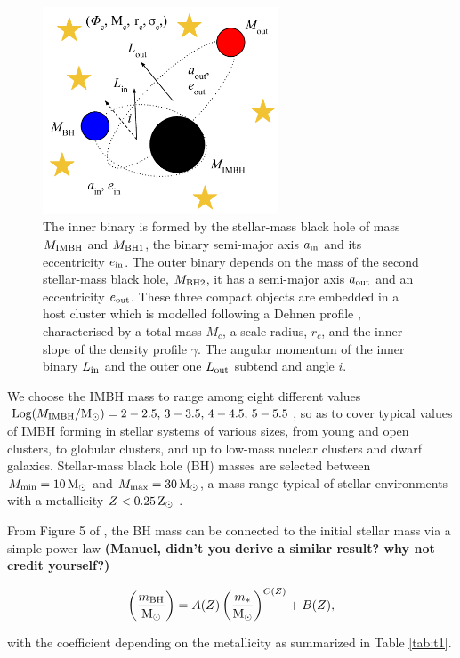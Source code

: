 \documentclass[useAMS,usenatbib]{mn2e}
\newcommand{\Ms}{{\rm M}_\odot}
\newcommand{\Zs}{{\rm Z}_\odot}
\newcommand{\ibh}{{\rm IMBH}}
\newcommand{\inn}{{\rm in}}
\newcommand{\out}{{\rm out}}
\newcommand{\bh}{{\rm BH}}
\newcommand{\bhu}{{\rm BH1}}
\newcommand{\bhd}{{\rm BH2}}
\begin{document}
\begin{figure}
    \centering
    \includegraphics[width=7cm]{triple}
    \caption{The inner binary is formed by the stellar-mass black hole of mass  $M_\ibh$ and $M_\bhu$, 
the binary semi-major axis $a_\inn$ and its eccentricity $e_\inn$. The outer binary depends on the mass of the
second stellar-mass black hole, $M_\bhd$, it has a semi-major axis  $a_\out$ and an eccentricity $e_\out$.
These three compact objects are embedded in a host cluster which is modelled following a Dehnen profile \citep{Deh93},
characterised by a total mass $M_c$, a scale radius, $r_c$, and the inner slope of the density profile $\gamma$. The angular
momentum of the inner binary $L_{\rm in}$ and the outer one $L_{\rm out}$ subtend and angle $i$.}
    \label{fig:f1}
\end{figure}

We choose the IMBH mass to range among eight different values ${\rm
Log}(M_\ibh/\Ms) = 2-2.5,\,3-3.5,\,4-4.5,\,5-5.5$, so as to cover typical values of
IMBH forming in stellar systems of various sizes, from young and open clusters,
to globular clusters, and up to low-mass nuclear clusters and dwarf galaxies.
Stellar-mass black hole (BH) masses are selected between $M_{\rm min} = 10\,\Ms$ and
$M_{\rm max} = 30\,\Ms$, a mass range typical of stellar environments with a
metallicity $Z<0.25\,\Zs$ \citep{belczynski16,spera16}. 

From Figure 5 of \cite{belczynski16}, the BH mass can be connected to the
initial stellar mass via a simple power-law \textbf{(Manuel, didn't you derive
a similar result? why not credit yourself?)}

\begin{equation}
\left(\frac{m_\bh}{\Ms}\right) = A(Z) \left(\frac{m_*}{\Ms}\right)^{C(Z)} + B(Z),
\end{equation}

\noindent
with the coefficient depending on the metallicity as summarized in Table \ref{tab:t1}.
\end{document}
